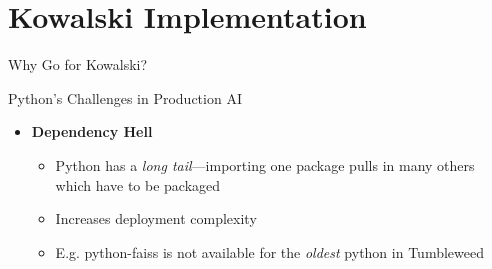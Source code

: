 \documentclass[aspectratio=169]{beamer}
\begin{document}
\section{Kowalski Implementation}
\begin{frame}{Why Go for Kowalski?}
\begin{block}{Python's Challenges in Production AI}
\begin{itemize}
    \item \textbf{Dependency Hell}  
    \begin{itemize}
        \item Python has a \textit{long tail}—importing one package pulls in many others which have to be packaged 
        \item Increases deployment complexity 
        \item E.g. python-faiss is not available for the \emph{oldest} python in Tumbleweed
    \end{itemize}
\end{itemize}
\end{block}


\end{frame}
\end{document}
